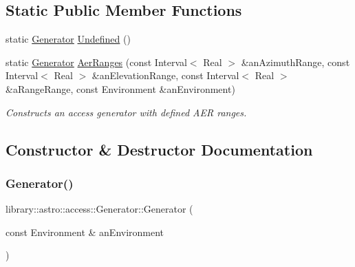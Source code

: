\subsection*{Static Public Member Functions}
\begin{DoxyCompactItemize}
\item 
static \hyperlink{classlibrary_1_1astro_1_1access_1_1_generator}{Generator} \hyperlink{classlibrary_1_1astro_1_1access_1_1_generator_a772aae06882c9c24c93978ec246bcc83}{Undefined} ()
\item 
static \hyperlink{classlibrary_1_1astro_1_1access_1_1_generator}{Generator} \hyperlink{classlibrary_1_1astro_1_1access_1_1_generator_ae81c6cc620f00a2318eb3dd3d9d62ce0}{Aer\+Ranges} (const Interval$<$ Real $>$ \&an\+Azimuth\+Range, const Interval$<$ Real $>$ \&an\+Elevation\+Range, const Interval$<$ Real $>$ \&a\+Range\+Range, const Environment \&an\+Environment)
\begin{DoxyCompactList}\small\item\em Constructs an access generator with defined A\+ER ranges. \end{DoxyCompactList}\end{DoxyCompactItemize}


\subsection{Constructor \& Destructor Documentation}
\mbox{\label{classlibrary_1_1astro_1_1access_1_1_generator_a7b07719b1622bb4ffb7fe0d654f91fea}} 
\subsubsection{\texorpdfstring{Generator()}{Generator()}\hspace{0.1cm}{\footnotesize\ttfamily [1/2]}}
{\footnotesize\ttfamily library\+::astro\+::access\+::\+Generator\+::\+Generator (\begin{DoxyParamCaption}\item[{const Environment \&}]{an\+Environment }\end{DoxyParamCaption})}

\mbox{\label{classlibrary_1_1astro_1_1access_1_1_generator_af97f7c62f7853dfda210de3012783dd1}} 
